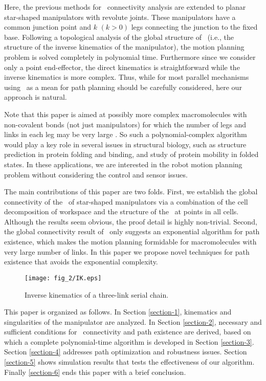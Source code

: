 Here, the previous methods for \cspace \ connectivity analysis are
extended to planar star-shaped manipulators with revolute joints.
These manipulators have a common junction point and $k$ $(k>0)$
legs connecting the junction to the fixed base. Following a
topological analysis of the global structure of \cspace \ (i.e.,
the structure of the inverse kinematics of the manipulator), the
motion planning problem is solved completely in polynomial time.
Furthermore since we consider only a point end-effector, the
direct kinematics is straightforward while the inverse kinematics
is more complex. Thus, while for most parallel mechanisms using
\cspace \ as a mean for path planning should be carefully
considered, here our approach is natural.

Note that this paper is aimed at possibly more complex
macromolecules with non-covalent bonds (not just manipulators) for
which the number of legs and links in each leg may be very large
\cite{JRKT01}. So such a polynomial-complex algorithm would play a
key role in several issues in structural biology, such as
structure prediction in protein folding and binding, and study of
protein mobility in folded states. In these applications, we are
interested in the robot motion planning problem without
considering the control and sensor issues.

The main contributions of this paper are two folds. First, we
establish the global connectivity of the \cspace \ of star-shaped
manipulators via a combination of the cell decomposition of
workspace and the structure of the \cspace \ at points in all
cells. Although the results seem obvious, the proof detail is
highly non-trivial. Second, the global connectivity result of
\cspace \ only suggests an exponential algorithm for path
existence, which makes the motion planning formidable for
macromolecules with very large number of links. In this paper we
propose novel techniques for path existence that avoids the
exponential complexity.
%
\begin{figure}[h]
  \centering
  \texttt{[image: fig\_2/IK.eps]}
  \caption{Inverse kinematics of a three-link serial chain.}
 \label{IK}
\end{figure}
%
This paper is organized as follows. In Section \ref{section-1},
kinematics and singularities of the manipulator are analyzed. In
Section \ref{section-2}, necessary and sufficient conditions for
\cspace \ connectivity and path existence are derived, based on
which a complete polynomial-time algorithm is developed in Section
\ref{section-3}. Section \ref{section-4} addresses path
optimization and robustness issues. Section \ref{section-5} shows
simulation results that tests the effectiveness of our algorithm.
Finally \ref{section-6} ends this paper with a brief conclusion.


